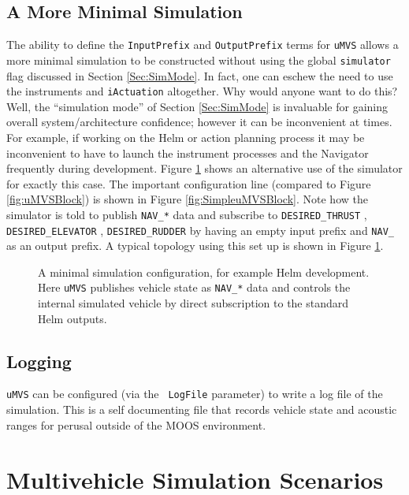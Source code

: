 \documentclass[a4paper,10pt]{article}
\newcommand{\Code}[1]{\texttt{#1} }
\newcommand{\code}[1]{\Code{#1} }
\begin{document}
\subsection{A More Minimal Simulation}\label{Sec:SimMinimal}

The ability to define the \code{InputPrefix} and
\code{OutputPrefix} terms for \code{uMVS} allows a more minimal
simulation to be constructed without using the global
\code{simulator} flag discussed in Section \ref{Sec:SimMode}.
In fact, one can eschew the need to use the instruments and
\code{iActuation} altogether. Why would anyone want to do this?
Well, the ``simulation mode'' of Section \ref{Sec:SimMode} is
invaluable for gaining overall system/architecture confidence;
however it can be inconvenient at times. For example, if working on
the Helm or action planning process it may be inconvenient  to
have to launch the instrument processes and the Navigator
frequently during development. Figure \ref{fig:SimpleSim} shows an
alternative use of the simulator for exactly this case.  The
important configuration line (compared to Figure \ref{fig:uMVSBlock}) is
shown in Figure \ref{fig:SimpleuMVSBlock}. Note how the simulator
is told to publish \code{NAV\_*} data and subscribe to
\code{DESIRED\_THRUST}, \code{DESIRED\_ELEVATOR}, \code{DESIRED\_RUDDER}
by having an empty input prefix and \code{NAV\_} as an output
prefix. A typical topology using this set up is shown in Figure
\ref{fig:SimpleSim}.

\begin{figure}[ht]
\centering {} \caption{A minimal simulation configuration, for
example Helm development. Here \code{uMVS} publishes vehicle
state as \code{NAV\_*} data and controls the internal simulated
vehicle by direct subscription to the standard Helm outputs.
}\label{fig:SimpleSim}
\end{figure}

\subsection{Logging}

\code{uMVS} can be configured (via the  \code{ LogFile} parameter)
to write a log file of the simulation. This is a self
documenting file that records vehicle state and acoustic ranges
for perusal outside of the MOOS environment.


\section{Multivehicle Simulation Scenarios}
\end{document}
